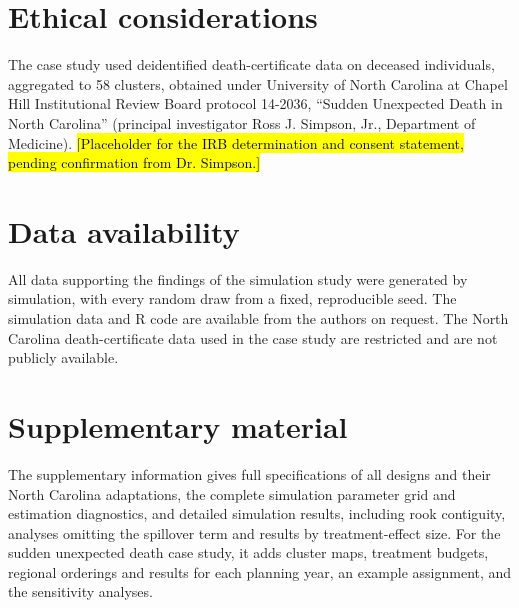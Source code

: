 \documentclass[Afour,sagev,times]{sagej}
\begin{document}
\section*{Ethical considerations}
The case study used deidentified death-certificate data on deceased individuals, aggregated to 58 clusters, obtained under University of North Carolina at Chapel Hill Institutional Review Board protocol 14-2036, ``Sudden Unexpected Death in North Carolina'' (principal investigator Ross J. Simpson, Jr., Department of Medicine). \hl{[Placeholder for the IRB determination and consent statement, pending confirmation from Dr. Simpson.]}
\section*{Data availability}
All data supporting the findings of the simulation study were generated by simulation, with every random draw from a fixed, reproducible seed. The simulation data and R code are available from the authors on request. The North Carolina death-certificate data used in the case study are restricted and are not publicly available.
\section*{Supplementary material}
The supplementary information gives full specifications of all designs and their North Carolina adaptations, the complete simulation parameter grid and estimation diagnostics, and detailed simulation results, including rook contiguity, analyses omitting the spillover term and results by treatment-effect size. For the sudden unexpected death case study, it adds cluster maps, treatment budgets, regional orderings and results for each planning year, an example assignment, and the sensitivity analyses.



\ifctjreading
\else
\clearpage
\CTJDesignTable
\clearpage
\CTJGridTable
\clearpage
\CTJMapFigure
\clearpage
\CTJGridFigure
\clearpage
\CTJAllocationFigure
\clearpage
\CTJMeanFigure
\clearpage
\fi
\end{document}

